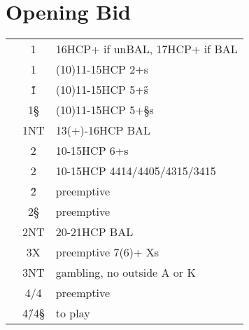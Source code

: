 
\hypertarget{open}{}
\hypertarget{top}{}
\chapter{Opening Bid}

\begin{longtable}{C{\linklength} C{\bidlength} l}
 & 1\C &16HCP+ if unBAL, 17HCP+ if BAL \\
 & 1\D &(10)11-15HCP 2+\D s\\
 &{1\H} &(10)11-15HCP 5+\H s\\
 &{1\S} &(10)11-15HCP 5+\S s\\
 &{1NT} &13(+)-16HCP BAL \\
 &{2\C} &10-15HCP 6+\C s\\
 &{2\D} &10-15HCP 4414/4405/4315/3415 \\
& 2\H &preemptive\\
& 2\S &preemptive\\
& 2NT &20-21HCP BAL \\
& 3X  &preemptive 7(6)+ Xs\\
& 3NT &gambling, no outside A or K\\
& 4\C/4\D & preemptive \\
& 4\H/4\S & to play \\
\end{longtable}

